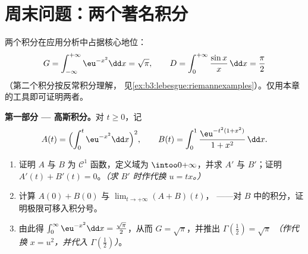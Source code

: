 \section{周末问题：两个著名积分}

\begin{problem}
\label{pb:b3:lebesgue:1}
两个积分在应用分析中占据核心地位：
\[
G = \int_{-\infty}^{+\infty}\eu^{-x^2}\dd x = \sqrt\pi,
\qquad
D = \int_0^{+\infty}\frac{\sin x}{x}\,\dd x = \frac\pi2
\]
（第二个积分按反常积分理解，
见\cref{ex:b3:lebesgue:riemannexamples}）。仅用本章
的工具即可证明两者。

\medskip
\noindent\textbf{第一部分 --- 高斯积分。}对 $t \geq 0$，记
\[
A(t) = \Bigl(\int_0^t\eu^{-x^2}\dd x\Bigr)^{2},
\qquad
B(t) = \int_0^1\frac{\eu^{-t^2(1 + x^2)}}{1 + x^2}\,\dd x .
\]
\begin{enumerate}
  \item 证明 $A$ 与 $B$ 为 $\mathcal C^1$ 函数，定义域为
        $\intoo0{+\infty}$，并求 $A'$ 与 $B'$；证明
        $A'(t) + B'(t) = 0$。\emph{（求 $B'$ 时作代换 $u =
        tx$。）}
  \item 计算 $A(0) + B(0)$ 与 $\lim_{t\to+\infty}(A + B)(t)$，
        ——对 $B$ 中的积分，证明极限可移入积分号。
  \item 由此得 $\int_0^\infty \eu^{-x^2}\dd x =
        \frac{\sqrt\pi}2$，从而 $G = \sqrt\pi$，并推出
        $\Gamma(\tfrac12) = \sqrt\pi$ \emph{（作代换 $x =
        u^2$，并代入 $\Gamma(\frac12)$）}。
\end{enumerate}


\end{problem}
